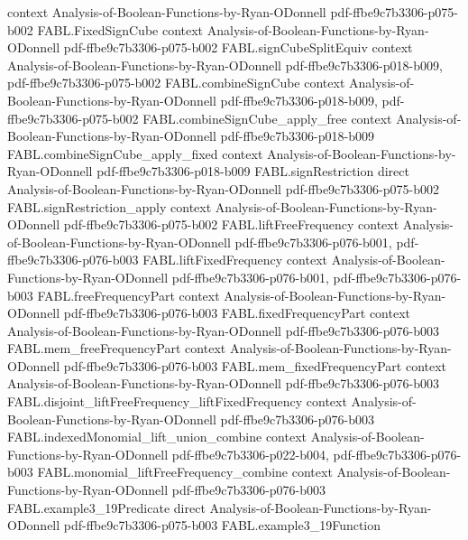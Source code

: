 \begin{theorem}
  {context}
  {Analysis-of-Boolean-Functions-by-Ryan-ODonnell}
  {pdf-ffbe9c7b3306-p075-b002}
\proofstep
  {FABL.FixedSignCube}
  {context}
  {Analysis-of-Boolean-Functions-by-Ryan-ODonnell}
  {pdf-ffbe9c7b3306-p075-b002}
\proofstep
  {FABL.signCubeSplitEquiv}
  {context}
  {Analysis-of-Boolean-Functions-by-Ryan-ODonnell}
  {pdf-ffbe9c7b3306-p018-b009,
    pdf-ffbe9c7b3306-p075-b002}
\proofstep
  {FABL.combineSignCube}
  {context}
  {Analysis-of-Boolean-Functions-by-Ryan-ODonnell}
  {pdf-ffbe9c7b3306-p018-b009,
    pdf-ffbe9c7b3306-p075-b002}
\proofstep
  {FABL.combineSignCube_apply_free}
  {context}
  {Analysis-of-Boolean-Functions-by-Ryan-ODonnell}
  {pdf-ffbe9c7b3306-p018-b009}
\proofstep
  {FABL.combineSignCube_apply_fixed}
  {context}
  {Analysis-of-Boolean-Functions-by-Ryan-ODonnell}
  {pdf-ffbe9c7b3306-p018-b009}
\proofstep
  {FABL.signRestriction}
  {direct}
  {Analysis-of-Boolean-Functions-by-Ryan-ODonnell}
  {pdf-ffbe9c7b3306-p075-b002}
\proofstep
  {FABL.signRestriction_apply}
  {context}
  {Analysis-of-Boolean-Functions-by-Ryan-ODonnell}
  {pdf-ffbe9c7b3306-p075-b002}
\proofstep
  {FABL.liftFreeFrequency}
  {context}
  {Analysis-of-Boolean-Functions-by-Ryan-ODonnell}
  {pdf-ffbe9c7b3306-p076-b001,
    pdf-ffbe9c7b3306-p076-b003}
\proofstep
  {FABL.liftFixedFrequency}
  {context}
  {Analysis-of-Boolean-Functions-by-Ryan-ODonnell}
  {pdf-ffbe9c7b3306-p076-b001,
    pdf-ffbe9c7b3306-p076-b003}
\proofstep
  {FABL.freeFrequencyPart}
  {context}
  {Analysis-of-Boolean-Functions-by-Ryan-ODonnell}
  {pdf-ffbe9c7b3306-p076-b003}
\proofstep
  {FABL.fixedFrequencyPart}
  {context}
  {Analysis-of-Boolean-Functions-by-Ryan-ODonnell}
  {pdf-ffbe9c7b3306-p076-b003}
\proofstep
  {FABL.mem_freeFrequencyPart}
  {context}
  {Analysis-of-Boolean-Functions-by-Ryan-ODonnell}
  {pdf-ffbe9c7b3306-p076-b003}
\proofstep
  {FABL.mem_fixedFrequencyPart}
  {context}
  {Analysis-of-Boolean-Functions-by-Ryan-ODonnell}
  {pdf-ffbe9c7b3306-p076-b003}
\proofstep
  {FABL.disjoint_liftFreeFrequency_liftFixedFrequency}
  {context}
  {Analysis-of-Boolean-Functions-by-Ryan-ODonnell}
  {pdf-ffbe9c7b3306-p076-b003}
\proofstep
  {FABL.indexedMonomial_lift_union_combine}
  {context}
  {Analysis-of-Boolean-Functions-by-Ryan-ODonnell}
  {pdf-ffbe9c7b3306-p022-b004,
    pdf-ffbe9c7b3306-p076-b003}
\proofstep
  {FABL.monomial_liftFreeFrequency_combine}
  {context}
  {Analysis-of-Boolean-Functions-by-Ryan-ODonnell}
  {pdf-ffbe9c7b3306-p076-b003}
\proofstep
  {FABL.example3_19Predicate}
  {direct}
  {Analysis-of-Boolean-Functions-by-Ryan-ODonnell}
  {pdf-ffbe9c7b3306-p075-b003}
\proofstep
  {FABL.example3_19Function}

\end{theorem}
